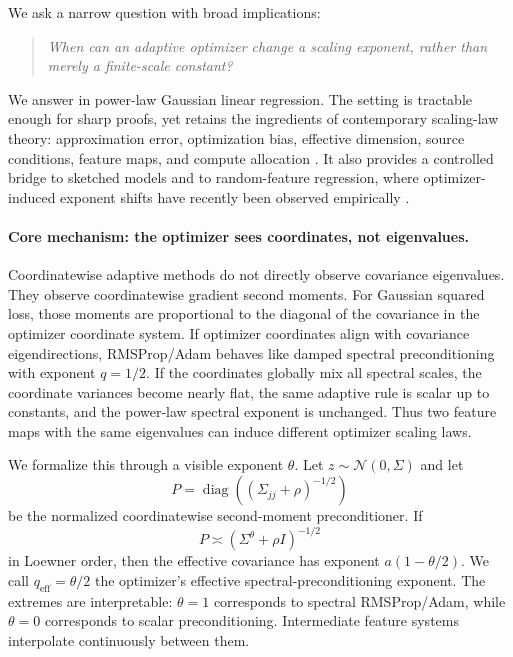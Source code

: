 \documentclass[letterpaper]{article} %
\newcommand{\diag}{\operatorname{diag}}
\newcommand{\qeff}{q_{\mathrm{eff}}}
\begin{document}
We ask a narrow question with broad implications:
\begin{quote}
\emph{When can an adaptive optimizer change a scaling exponent, rather than merely a finite-scale constant?}
\end{quote}
We answer in power-law Gaussian linear regression.  The setting is tractable enough for sharp proofs, yet retains the ingredients of contemporary scaling-law theory: approximation error, optimization bias, effective dimension, source conditions, feature maps, and compute allocation \cite{bartlett2020benign,hastie2022surprises,bordelon2020spectrum,canatar2021spectral,lin2024scaling}.  It also provides a controlled bridge to sketched models and to random-feature regression, where optimizer-induced exponent shifts have recently been observed empirically \cite{ramani2026optimizer}.

\paragraph{Core mechanism: the optimizer sees coordinates, not eigenvalues.}
Coordinatewise adaptive methods do not directly observe covariance eigenvalues.  They observe coordinatewise gradient second moments.  For Gaussian squared loss, those moments are proportional to the diagonal of the covariance in the optimizer coordinate system.  If optimizer coordinates align with covariance eigendirections, RMSProp/Adam behaves like damped spectral preconditioning with exponent $q=1/2$.  If the coordinates globally mix all spectral scales, the coordinate variances become nearly flat, the same adaptive rule is scalar up to constants, and the power-law spectral exponent is unchanged.  Thus two feature maps with the same eigenvalues can induce different optimizer scaling laws.

We formalize this through a visible exponent $\theta$.  Let $z\sim\mathcal N(0,\Sigma)$ and let
\[
 P=\diag((\Sigma_{jj}+\rho)^{-1/2})
\]
be the normalized coordinatewise second-moment preconditioner.  If
\begin{equation}
\label{eq:intro-comparability}
 P\asymp(\Sigma^\theta+\rho I)^{-1/2}
\end{equation}
in Loewner order, then the effective covariance has exponent $a(1-\theta/2)$.  We call $\qeff=\theta/2$ the optimizer's effective spectral-preconditioning exponent.  The extremes are interpretable: $\theta=1$ corresponds to spectral RMSProp/Adam, while $\theta=0$ corresponds to scalar preconditioning.  Intermediate feature systems interpolate continuously between them.
\end{document}

